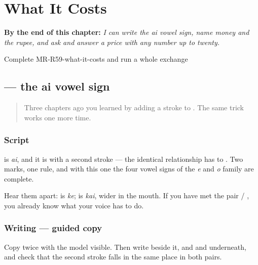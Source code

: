 
\chapter{What It Costs}
\label{ch:mr-what-it-costs}

\begin{chapteropening}
\textbf{By the end of this chapter:} \emph{I can write the ai vowel sign, name money and the rupee, and ask and answer a price with any number up to twenty.}

Complete MR-R59-what-it-costs and run a whole exchange
\end{chapteropening}

\section[\texorpdfstring{\mr{ै} (-ai)}{ै (-ai)}]{ — the ai vowel sign}

\label{lesson:MR-W59-ai-matra}



\begin{quote}
Three chapters ago you learned \textbf{} by adding a stroke to \textbf{}. The same trick works one more time.
\end{quote}

\subsection*{Script}
\begin{quote}
\end{quote}

\textbf{} is \emph{ai}, and it is \textbf{} with a second stroke — the identical relationship \textbf{} has to \textbf{}. Two marks, one rule, and with this one the four vowel signs of the \emph{e} and \emph{o} family are complete.

Hear them apart: \textbf{} is \emph{ke}; \textbf{} is \emph{kai}, wider in the mouth. If you have met the pair \textbf{} / \textbf{}, you already know what your voice has to do.

\subsection*{Writing — guided copy}
Copy \textbf{} twice with the model visible. Then write \textbf{} beside it, and \textbf{} and \textbf{} underneath, and check that the second stroke falls in the same place in both pairs.

